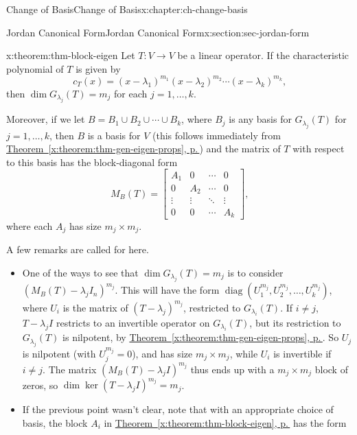 \documentclass[oneside,10pt,]{book}
\newcommand{\xreffont}{\relax}
\numberwithin{equation}{section}
\newcommand{\bbm}{\begin{bmatrix}}
\newcommand{\ebm}{\end{bmatrix}}
\newcommand{\diag}{\operatorname{diag}}
\newcommand{\amp}{&}
\begin{document}
\begin{chapterptx}{Change of Basis}{}{Change of Basis}{}{}{x:chapter:ch-change-basis}
\begin{sectionptx}{Jordan Canonical Form}{}{Jordan Canonical Form}{}{}{x:section:sec-jordan-form}
\begin{theorem}{}{}{x:theorem:thm-block-eigen}%
Let \(T:V\to V\) be a linear operator. If the characteristic polynomial of \(T\) is given by%
\begin{equation*}
c_T(x) = (x-\lambda_1)^{m_1}(x-\lambda_2)^{m_2}\cdots (x-\lambda_k)^{m_k}\text{,}
\end{equation*}
then \(\dim G_{\lambda_j}(T)=m_j\) for each \(j=1,\ldots, k\).%
\par
Moreover, if we let \(B=B_1\cup B_2\cup\cdots \cup B_k\), where \(B_j\) is any basis for \(G_{\lambda_j}(T)\) for \(j=1,\ldots, k\), then \(B\) is a basis for \(V\) (this follows immediately from \hyperref[x:theorem:thm-gen-eigen-props]{Theorem~{\xreffont\ref{x:theorem:thm-gen-eigen-props}}, p.\,\pageref{x:theorem:thm-gen-eigen-props}}) and the matrix of \(T\) with respect to this basis has the block-diagonal form%
\begin{equation*}
M_B(T) = \bbm A_1 \amp 0 \amp \cdots \amp 0\\
0 \amp A_2 \amp \cdots \amp 0\\
\vdots\amp\vdots\amp\ddots\amp\vdots\\
0 \amp 0 \amp \cdots \amp A_k\ebm\text{,}
\end{equation*}
where each \(A_j\) has size \(m_j\times m_j\).%
\end{theorem}
A few remarks are called for here.%
\begin{itemize}[label=\textbullet]
\item{}One of the ways to see that \(\dim G_{\lambda_j}(T)=m_j\) is to consider \((M_B(T)-\lambda_j I_n)^{m_j}\). This will have the form \(\diag(U_1^{m_j}, U_2^{m_j},\ldots, U_k^{m_j})\), where \(U_i\) is the matrix of \((T-\lambda_j)^{m_j}\), restricted to \(G_{\lambda_i}(T)\). If \(i\neq j\), \(T-\lambda_j I\) restricts to an invertible operator on \(G_{\lambda_i}(T)\), but its restriction to \(G_{\lambda_j}(T)\) is nilpotent, by \hyperref[x:theorem:thm-gen-eigen-props]{Theorem~{\xreffont\ref{x:theorem:thm-gen-eigen-props}}, p.\,\pageref{x:theorem:thm-gen-eigen-props}}. So \(U_j\) is nilpotent (with \(U_j^{m_j}=0\)), and has size \(m_j\times m_j\), while \(U_i\) is invertible if \(i\neq j\). The matrix \((M_B(T)-\lambda_j I)^{m_j}\) thus ends up with a \(m_j\times m_j\) block of zeros, so \(\dim \ker (T-\lambda_j I)^{m_j}=m_j\).%
\item{}If the previous point wasn't clear, note that with an appropriate choice of basis, the block \(A_i\) in \hyperref[x:theorem:thm-block-eigen]{Theorem~{\xreffont\ref{x:theorem:thm-block-eigen}}, p.\,\pageref{x:theorem:thm-block-eigen}} has the form%

\end{itemize}
\end{sectionptx}
\end{chapterptx}
\end{document}
